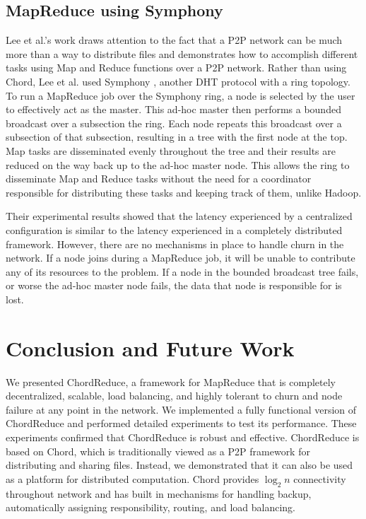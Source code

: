 \documentclass[10pt, conference, compsocconf]{IEEEtran}
\begin{document}
\subsection{MapReduce using Symphony}

Lee et al.'s work \cite{leemap} draws attention to the fact that a P2P network can be much more than a way to distribute files and demonstrates how to accomplish different tasks using Map and Reduce functions over a P2P network.  Rather than using Chord, Lee et al. used Symphony \cite{symphony}, another DHT protocol with a ring topology.  To run a MapReduce job over the Symphony ring, a node is selected by the user to effectively act as the master.  This ad-hoc master then performs a bounded broadcast over a subsection the ring.  Each node repeats this broadcast over a subsection of that subsection, resulting in a tree with the first node at the top.  Map tasks are disseminated evenly throughout the tree and their results are reduced on the way back up to the ad-hoc master node.  This allows the ring to disseminate Map and Reduce tasks without the need for a coordinator responsible for distributing these tasks and keeping track of them, unlike Hadoop.
 
Their experimental results showed that the latency experienced by a centralized configuration is similar to the latency experienced in a completely distributed framework.  However, there are no mechanisms in place to handle churn in the network.  If a node joins during a MapReduce job, it will be unable to contribute any of its resources to the problem. If a node in the bounded broadcast tree fails, or worse the ad-hoc master node fails, the data that node is responsible for is lost. 

\section{Conclusion and Future Work}
We presented ChordReduce, a framework for MapReduce that is completely decentralized, scalable, load balancing, and highly tolerant to churn and node failure at any point in the network. We implemented a fully functional version of ChordReduce and performed detailed experiments to test its performance. These experiments confirmed that ChordReduce is robust and effective. ChordReduce is based on Chord, which is traditionally viewed as a P2P framework for distributing and sharing files.  Instead, we demonstrated that it can also be used as a platform for distributed computation.  Chord provides $\log_{2} n$ connectivity throughout network and has built in mechanisms for handling backup, automatically assigning responsibility, routing, and load balancing. 
\end{document}
